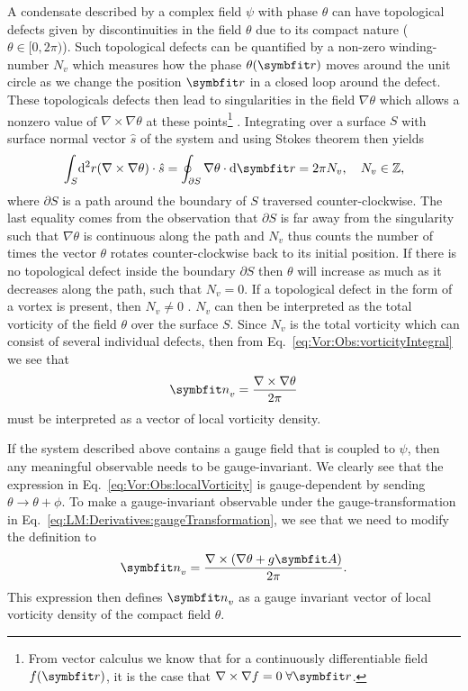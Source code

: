A condensate described by a complex field $\psi$ with phase $\theta$ can have topological defects given by discontinuities in the field $\theta$ due to its compact
nature ($\theta\in[0,2\pi)$). Such topological defects can be quantified by a non-zero winding-number $N_v$ which measures how the phase $\theta(\v{r})$ moves around the
unit circle as we change the position $\v{r}$ in a closed loop around the defect. These topologicals
defects then lead to singularities in the field $\nabla\theta$ which allows a nonzero value of $\nabla\times\nabla\theta$ at these points\footnote{From vector calculus
we know that for a continuously differentiable field $f(\v{r})$, it is the case that $\nabla\times\nabla f = 0\;\forall\v{r}$.}%
. Integrating over a surface
$S$ with surface normal vector $\hat{s}$ of the system and using Stokes theorem then yields
\begin{equation}
    \label{eq:Vor:Obs:vorticityIntegral}
    \int_S\!\mathrm{d}^2r (\nabla\times\nabla\theta)\cdot\hat{s} = \oint_{\partial S}\nabla\theta\cdot\mathrm{d}\v{r} = 2\pi N_v,\quad N_v\in\mathbb{Z},
\end{equation}
where $\partial S$ is a path around the boundary of $S$ traversed counter-clockwise. The last equality comes from the observation that
$\partial S$ is far away from the singularity such that $\nabla\theta$ is continuous along the path and $N_v$ thus counts the number of times the vector $\theta$
rotates counter-clockwise back to its initial position. If there is no topological defect inside the boundary $\partial S$ then $\theta$ will increase as much as it
decreases along the path, such that $N_v=0$. If a topological defect in the form of a vortex is present, then $N_v\neq0$ \cite{Smorgrav052}.
$N_v$ can then be interpreted as the total vorticity of the field $\theta$ over the surface $S$.
Since $N_v$ is the total vorticity which can consist of several individual defects, then from Eq.~\eqref{eq:Vor:Obs:vorticityIntegral} we see that
\begin{equation}
    \label{eq:Vor:Obs:localVorticity}
    \v{n}_v = \frac{\nabla\times\nabla\theta}{2\pi} 
\end{equation}
must be interpreted as a vector of local vorticity density.

If the system described above contains a gauge field that is coupled to $\psi$, then any meaningful observable needs to be gauge-invariant.
We clearly see that the expression in Eq.~\eqref{eq:Vor:Obs:localVorticity} is gauge-dependent by sending $\theta\to\theta+\phi$. To make a gauge-invariant observable under
the gauge-transformation in Eq.~\eqref{eq:LM:Derivatives:gaugeTransformation}, we see that we need to modify the definition to
\begin{equation}
    \label{eq:Vor:Obs:localVorticity}
    \v{n}_v = \frac{\nabla\times(\nabla\theta + g\v{A})}{2\pi}.
\end{equation}
This expression then defines $\v{n}_v$ as a gauge invariant vector of local vorticity density of the compact field $\theta$.

